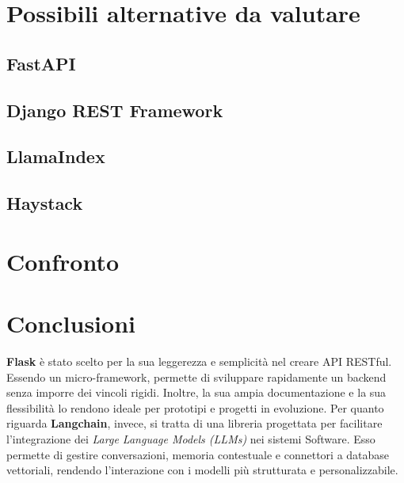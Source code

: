 \documentclass{article}
\begin{document}
\section{Possibili alternative da valutare}

\subsection{FastAPI}

\subsection{Django REST Framework}

\subsection{LlamaIndex}

\subsection{Haystack}



\section{Confronto}


\section{Conclusioni}
\textbf{Flask} è stato scelto per la sua leggerezza e semplicità nel creare 
API RESTful. Essendo un micro-framework, permette di sviluppare 
rapidamente un backend senza imporre dei vincoli rigidi. 
Inoltre, la sua ampia documentazione e la sua flessibilità lo rendono 
ideale per prototipi e progetti in evoluzione.
Per quanto riguarda \textbf{Langchain}, invece, si tratta di una libreria
progettata per facilitare l'integrazione dei \textit{Large Language Models (LLMs)}
nei sistemi Software. Esso permette di gestire conversazioni, memoria
contestuale e connettori a database vettoriali, rendendo l'interazione 
con i modelli più strutturata e personalizzabile.
\end{document}
